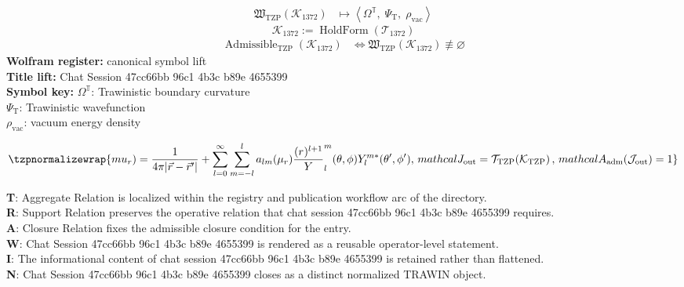 \noindent
\begin{minipage}[t]{0.48\linewidth}
\begingroup
\small
\[
\begin{aligned}
\mathfrak{W}_{\mathrm{TZP}}\!\left(\mathcal{K}_{1372}\right)
&\longmapsto
\left\langle \Omega^{\mathbb{T}},\; \Psi_{\mathrm{T}},\; \rho_{\mathrm{vac}} \right\rangle
\end{aligned}
\]
\[
\mathcal{K}_{1372}
:=
\operatorname{HoldForm}\!\left(\mathcal{T}_{1372}\right)
\]
\[
\begin{aligned}
\operatorname{Admissible}_{\mathrm{TZP}}\!\left(\mathcal{K}_{1372}\right)
&\Longleftrightarrow
\mathfrak{W}_{\mathrm{TZP}}\!\left(\mathcal{K}_{1372}\right)\not\equiv\varnothing
\end{aligned}
\]
\textbf{Wolfram register:} canonical symbol lift\\
\textbf{Title lift:} Chat Session 47cc66bb 96c1 4b3c b89e 4655399\\
\textbf{Symbol key:} \(\Omega^{\mathbb{T}}\): Trawinistic boundary curvature\\ \(\Psi_{\mathrm{T}}\): Trawinistic wavefunction\\ \(\rho_{\mathrm{vac}}\): vacuum energy density
\par
\endgroup
\end{minipage}\hfill
\begin{minipage}[t]{0.48\linewidth}
\[
\tzpnormalizewrap{mu_{r}) = \frac{1}{4\pi|\vec{r}-\vec{r}^{\prime}|} + \sum_{l=0}^{\infty}\sum_{m=-l}^{l}a_{lm}(\mu_{r})\frac{(r_{ })^{l+1}}Y_{l}^{m}(\theta,\phi)Y_{l}^{m*}(\theta^{\prime},\phi^{\prime}),\,mathcal{J}_{\mathrm{out}} = \mathcal{T}_{\mathrm{TZP}}\!\left(\mathcal{K}_{\mathrm{TZP}}\right),\,mathcal{A}_{\mathrm{adm}}\!\left(\mathcal{J}_{\mathrm{out}}\right)=1}
\]

\small
\textbf{T}: Aggregate Relation is localized within the registry and publication workflow arc of the directory.\\
\textbf{R}: Support Relation preserves the operative relation that chat session 47cc66bb 96c1 4b3c b89e 4655399 requires.\\
\textbf{A}: Closure Relation fixes the admissible closure condition for the entry.\\
\textbf{W}: Chat Session 47cc66bb 96c1 4b3c b89e 4655399 is rendered as a reusable operator-level statement.\\
\textbf{I}: The informational content of chat session 47cc66bb 96c1 4b3c b89e 4655399 is retained rather than flattened.\\
\textbf{N}: Chat Session 47cc66bb 96c1 4b3c b89e 4655399 closes as a distinct normalized TRAWIN object.
\normalsize
\end{minipage}

